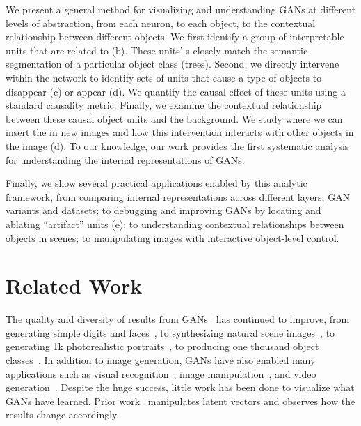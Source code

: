 \documentclass{article} %
\begin{document}
We present a general method for visualizing and understanding GANs at different levels of abstraction, from each neuron, to each object, to the contextual relationship between different objects. We first identify a group of interpretable units that are related to \concepts (b). These units' {\featuremap}s closely match the semantic segmentation of a particular object class (\eg trees). Second, we directly intervene within the network to identify sets of units that cause a type of objects to disappear (c) or appear (d). We quantify the causal effect of these units using a standard causality metric. Finally, we examine the contextual relationship between these causal object units and the background. We study where we can insert the \concepts in new images and how this intervention interacts with other objects in the image (d). To our knowledge, our work provides the first systematic analysis for understanding the internal representations of GANs.

Finally, we show several practical applications enabled by this analytic framework, from comparing internal representations across different layers, GAN variants and datasets; to debugging and improving GANs by locating and ablating ``artifact'' units (e); to understanding contextual relationships between objects in scenes; to manipulating images with interactive object-level control. 
\section{Related Work} The quality and diversity of results from GANs~\citep{goodfellow2014generative} has continued to improve, from generating simple digits and faces~\citep{goodfellow2014generative}, to synthesizing natural scene images~\citep{radford2015unsupervised,denton2015deep}, to generating 1k photorealistic portraits~\citep{karras2018progressive}, to producing one thousand object classes~\citep{miyato2018spectral,zhang2018self}. In addition to image generation, GANs have also enabled many applications such as visual recognition~\citep{wang2017fast,hoffman2018cycada}, image manipulation~\citep{isola2017image,zhu2017unpaired}, and video generation~\citep{mathieu2016deep,wang2018vid2vid}. Despite the huge success, little work has been done to visualize what GANs have learned. Prior work~\citep{radford2015unsupervised,zhu2016generative} manipulates latent vectors and observes how the results change accordingly.
\end{document}

